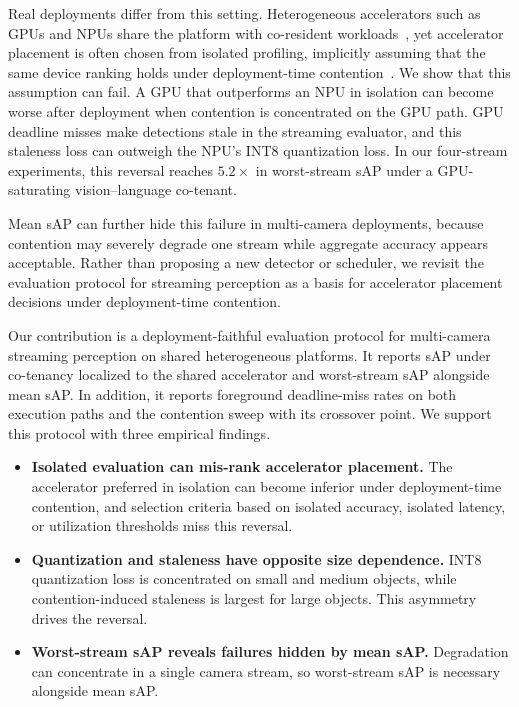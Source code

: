 \documentclass[runningheads]{llncs}
\begin{document}
Real deployments differ from this setting. Heterogeneous accelerators such as GPUs and NPUs share the platform with co-resident workloads~\cite{mobilint-aries,igniter}, yet accelerator placement is often chosen from isolated profiling, implicitly assuming that the same device ranking holds under deployment-time contention~\cite{partitiontuner,ngs,rl-scheduler,tod}. We show that this assumption can fail. A GPU that outperforms an NPU in isolation can become worse after deployment when contention is concentrated on the GPU path. GPU deadline misses make detections stale in the streaming evaluator, and this staleness loss can outweigh the NPU's INT8 quantization loss. In our four-stream experiments, this reversal reaches $5.2\times$ in worst-stream sAP under a GPU-saturating vision--language co-tenant.

Mean sAP can further hide this failure in multi-camera deployments, because contention may severely degrade one stream while aggregate accuracy appears acceptable. Rather than proposing a new detector or scheduler, we revisit the evaluation protocol for streaming perception as a basis for accelerator placement decisions under deployment-time contention.

Our contribution is a deployment-faithful evaluation protocol for multi-camera streaming perception on shared heterogeneous platforms. It reports sAP under co-tenancy localized to the shared accelerator and worst-stream sAP alongside mean sAP. In addition, it reports foreground deadline-miss rates on both execution paths and the contention sweep with its crossover point. We support this protocol with three empirical findings.

\begin{itemize}
\item \textbf{Isolated evaluation can mis-rank accelerator placement.}
The accelerator preferred in isolation can become inferior under deployment-time contention, and selection criteria based on isolated accuracy, isolated latency, or utilization thresholds miss this reversal.

\item \textbf{Quantization and staleness have opposite size dependence.}
INT8 quantization loss is concentrated on small and medium objects, while contention-induced staleness is largest for large objects. This asymmetry drives the reversal.

\item \textbf{Worst-stream sAP reveals failures hidden by mean sAP.}
Degradation can concentrate in a single camera stream, so worst-stream sAP is necessary alongside mean sAP.
\end{itemize}
\end{document}
